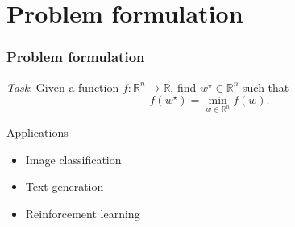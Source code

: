 \documentclass[17pt,institute=e10]{tuhh_presentation}
\newcommand{\R}{\mathbb{R}}
\newcommand{\f}{f : \R^n \rightarrow \R}
\begin{document}











\begin{frame}[agenda]
  \tableofcontents
\end{frame}

\section{Problem formulation}

\begin{frame}
  \frametitle{Problem formulation}
  \emph{Task}: Given a function $\f$, find $w^\star \in \R^n$ such that 
  \begin{equation*}
    f(w^\star) = \min_{w \in \R^n} f(w).
  \end{equation*}
  \begin{block}{Applications}
  \begin{itemize}
    \item Image classification
    \item Text generation
    \item Reinforcement learning
  \end{itemize}
  \end{block}
\end{frame}
\end{document}
